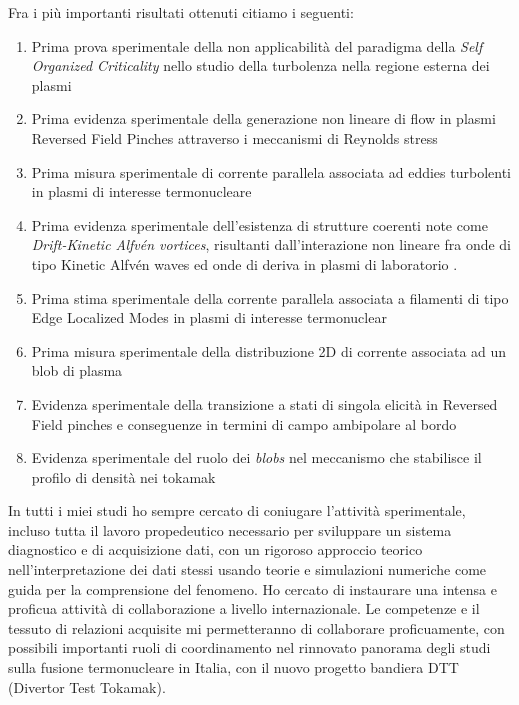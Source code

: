 Fra i pi{\`u} importanti risultati ottenuti citiamo i seguenti:
\begin{enumerate}[itemsep=0.05ex, label=\textbf{\roman*}]
\item Prima prova sperimentale della non applicabilit{\`a} del
  paradigma della \emph{Self
    Organized Criticality} nello studio della turbolenza nella regione
  esterna dei plasmi \parencite{Spada:2001p3574,Antoni:2001p3221}
\item Prima evidenza sperimentale della generazione non lineare di
  flow in plasmi Reversed Field Pinches attraverso i meccanismi di
  Reynolds stress \parencite{Vianello:2005p1976,Vianello:2005p2671}
\item Prima misura sperimentale di corrente parallela associata ad
  eddies turbolenti in plasmi di interesse termonucleare \parencite{Spolaore:2009p4115} 
\item Prima evidenza sperimentale dell'esistenza di strutture coerenti
  note come \emph{Drift-Kinetic Alfv\'en
    vortices}, risultanti dall'interazione non lineare fra onde di
  tipo 
  Kinetic Alfv\'en waves ed onde di deriva in plasmi di laboratorio
  \parencite{Vianello:2010p4670}.
\item Prima stima sperimentale della corrente parallela associata a
  filamenti di tipo Edge Localized Modes in plasmi di interesse termonuclear \parencite{PhysRevLett.106.125002}
\item Prima misura sperimentale della distribuzione 2D di corrente
  associata ad un blob di plasma \parencite{Furno:2011cs}
\item Evidenza sperimentale della transizione a stati di singola
  elicit{\`a} in Reversed Field pinches
  \parencite{Lorenzini:2009p4248} e conseguenze in termini di campo
  ambipolare al bordo \parencite{Spizzo:2014jn}
\item Evidenza sperimentale del ruolo dei \emph{blobs} nel meccanismo
  che stabilisce il profilo di densit{\`a} nei tokamak \parencite{Carralero:prl2015, Vianello:2017ku}
\end{enumerate}
In tutti i miei studi ho sempre cercato di coniugare l'attivit{\`a}
sperimentale, incluso tutta il lavoro propedeutico necessario per
sviluppare un sistema diagnostico e di acquisizione dati, con un
rigoroso approccio teorico nell'interpretazione dei dati stessi usando
teorie e simulazioni numeriche come guida per la comprensione del
fenomeno. Ho cercato di instaurare una intensa e proficua attivit{\`a}
di collaborazione a livello internazionale.  Le competenze e il
tessuto di relazioni acquisite
mi permetteranno di collaborare proficuamente, con possibili
importanti ruoli di
coordinamento nel rinnovato panorama
degli studi sulla fusione termonucleare in Italia, con il nuovo
progetto bandiera DTT (Divertor Test Tokamak).\\
